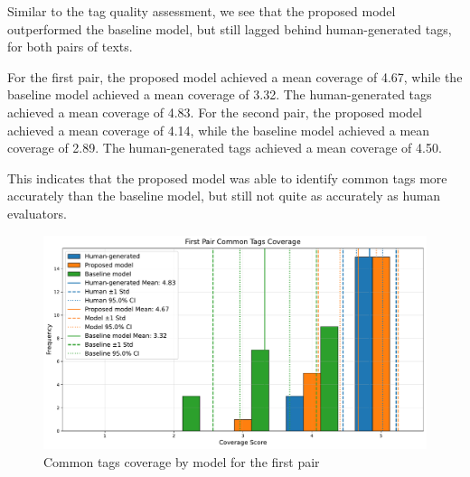 Similar to the tag quality assessment, we see that the proposed model outperformed the baseline model, but still lagged behind human-generated tags, for both pairs of texts.

For the first pair, the proposed model achieved a mean coverage of 4.67, while the baseline model achieved a mean coverage of 3.32. The human-generated tags achieved a mean coverage of 4.83. For the second pair, the proposed model achieved a mean coverage of 4.14, while the baseline model achieved a mean coverage of 2.89. The human-generated tags achieved a mean coverage of 4.50.

This indicates that the proposed model was able to identify common tags more accurately than the baseline model, but still not quite as accurately as human evaluators.

\begin{figure}[h]
    \centering
    \includegraphics[width=1\textwidth]{figures/first_pair_common_tags_coverage_comparison.pdf}
    \caption{Common tags coverage by model for the first pair}
    \label{fig:first_pair_common_tags_coverage_comparison}
\end{figure}



